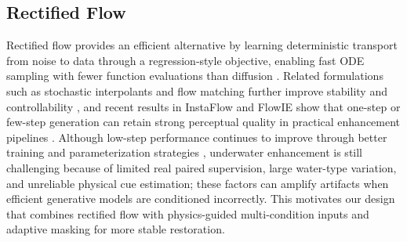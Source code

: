 \subsection{Rectified Flow}
Rectified flow provides an efficient alternative by learning deterministic transport from noise to data through a regression-style objective, enabling fast ODE sampling with fewer function evaluations than diffusion \cite{r11}. Related formulations such as stochastic interpolants and flow matching further improve stability and controllability \cite{r28,r29}, and recent results in InstaFlow and FlowIE show that one-step or few-step generation can retain strong perceptual quality in practical enhancement pipelines \cite{r30,r49}. Although low-step performance continues to improve through better training and parameterization strategies \cite{r50,r51}, underwater enhancement is still challenging because of limited real paired supervision, large water-type variation, and unreliable physical cue estimation; these factors can amplify artifacts when efficient generative models are conditioned incorrectly. This motivates our design that combines rectified flow with physics-guided multi-condition inputs and adaptive masking for more stable restoration.
